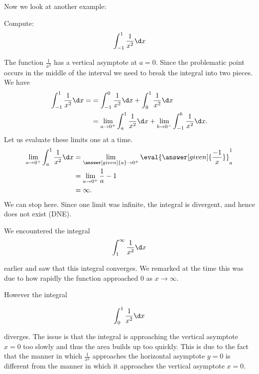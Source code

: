 \documentclass{ximera}
\begin{document}
Now we look at another example: 

\begin{example}	
  Compute:
  \[
  \int_{-1}^1 \frac{1}{x^2} \d x
  \]
  \begin{explanation}
    The function $\frac{1}{x^2}$ has a vertical asymptote at $a=0$. Since the problematic point 
occurs in the middle of the interval we need to break the integral into two pieces.
  We have
\begin{align*}
  \int_{-1}^1 \frac{1}{x^2} \d x =&= \int_{-1}^{0} \frac{1}{x^2} \d x + \int_{0}^{1} \frac{1}{x^2} \d x \\
&= \lim_{a \to 0^+} \int_{a}^1 \frac{1}{x^2} \d x  + \lim_{b \to 0^-} \int_{-1}^{b} \frac{1}{x^2} \d x.
 \end{align*}
  Let us evaluate these limits one at a time.
  \begin{align*}
    \lim_{a \to 0^+} \int_{a}^1 \frac{1}{x^2} \d x  &=  \lim_{\answer[given]{a} \to 0^+} \eval{\answer[given]{\frac{-1}{x}}}_a^1 \\
    &=  \lim_{a \to 0^+} \frac{1}{a}-1\\
    &= \infty.
  \end{align*}
    We can stop here. Since one limit was infinite, the integral is
    divergent, and hence does not exist (DNE). 
  \end{explanation}
\end{example}

\begin{remark}
We encountered the integral
\[
\int_{1}^{\infty} \frac{1}{x^2} \d x 
\]

earlier and saw that this integral converges. We remarked at the time this was due to how rapidly the function approached $0$ as $x \to \infty$. 

However the integral

\[
\int_{0}^{1} \frac{1}{x^2} \d x 
\]

diverges. The issue is that the integral is approaching the vertical asymptote $x=0$ too slowly and thus the area builds up too quickly. This is due to the fact that the manner in which $\frac{1}{x^2}$ approaches the horizontal asymptote $y=0$ is different from the manner in which 
it approaches the vertical asymptote $x=0$. 
\end{remark}
\end{document}
